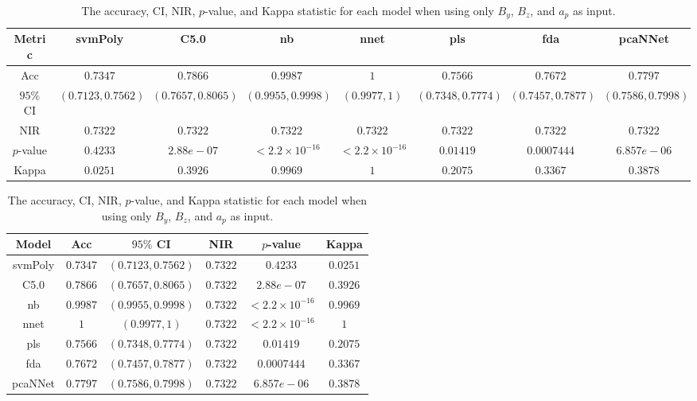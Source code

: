 \begin{table}[!ht]
	\centering
	\begin{tabular}{|c|c|c|c|c|c|c|c|}
		\hline
		Metric & svmPoly & C5.0 & nb & nnet & pls & fda & pcaNNet \\ \hline
		Acc & $0.7347$ & $0.7866$ & $0.9987$ & $1$ & $0.7566$ & $0.7672$ & $0.7797$ \\ \hline
		$95\%$ CI & $(0.7123, 0.7562)$ & $(0.7657, 0.8065)$ & $(0.9955, 0.9998)$ & $(0.9977, 1)$ & $(0.7348, 0.7774)$ & $(0.7457, 0.7877)$ & $(0.7586, 0.7998)$ \\ \hline
		NIR & $0.7322$ & $0.7322$ & $0.7322$ & $0.7322$ & $0.7322$ & $0.7322$ & $0.7322$ \\ \hline
		$p$-value & $0.4233$ & $2.88e-07$ & $< 2.2 \times {10}^{-16}$ & $< 2.2 \times {10}^{-16}$ & $0.01419$ & $0.0007444$ & $6.857e-06$ \\ \hline
		Kappa & $0.0251$ & $0.3926$ & $0.9969$ & $1$ & $0.2075$ & $0.3367$ & $0.3878$ \\ \hline
	\end{tabular}
	\caption{The accuracy, CI, NIR, $p$-value, and Kappa statistic for each model when using only $B_{y}$, $B_{z}$, and $a_{p}$ as input.}
	\label{tab:stats:yzap}
\end{table}

\begin{table}[!ht]
	\centering
	\begin{tabular}{|c|c|c|c|c|c|}
		\hline
		Model & Acc & $95\%$ CI & NIR & $p$-value & Kappa \\ \hline
		svmPoly & $0.7347$ & $(0.7123, 0.7562)$ & $0.7322$ & $0.4233$ & $0.0251$ \\ \hline
		C5.0 & $0.7866$ & $(0.7657, 0.8065)$ & $0.7322$ & $2.88e-07$ & $0.3926$ \\ \hline
		nb & $0.9987$ & $(0.9955, 0.9998)$ & $0.7322$ & $< 2.2 \times {10}^{-16}$ & $0.9969$ \\ \hline
		nnet & $1$ & $(0.9977, 1)$ & $0.7322$ & $< 2.2 \times {10}^{-16}$ & $1$ \\ \hline
		pls & $0.7566$ & $(0.7348, 0.7774)$ & $0.7322$ & $0.01419$ & $0.2075$ \\ \hline
		fda & $0.7672$ & $(0.7457, 0.7877)$ & $0.7322$ & $0.0007444$ & $0.3367$ \\ \hline
		pcaNNet & $0.7797$ & $(0.7586, 0.7998)$ & $0.7322$ & $6.857e-06$ & $0.3878$ \\ \hline
	\end{tabular}
	\caption{The accuracy, CI, NIR, $p$-value, and Kappa statistic for each model when using only $B_{y}$, $B_{z}$, and $a_{p}$ as input.}
	\label{tab:stats:reverse:yzap}
\end{table}

